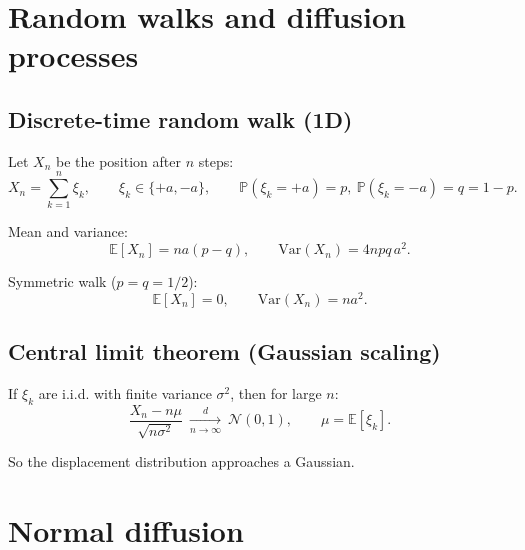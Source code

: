 
\section{Random walks and diffusion processes}

\subsection{Discrete-time random walk (1D)}
Let $X_n$ be the position after $n$ steps:
\begin{equation}
X_n = \sum_{k=1}^n \xi_k,
\qquad 
\xi_k \in \{+a,-a\},
\qquad 
\mathbb{P}(\xi_k=+a)=p,\ \mathbb{P}(\xi_k=-a)=q=1-p.
\end{equation}

Mean and variance:
\begin{equation}
\mathbb{E}[X_n] = n a (p-q),
\qquad
\mathrm{Var}(X_n)=4npq\,a^2.
\end{equation}

Symmetric walk ($p=q=1/2$):
\begin{equation}
\mathbb{E}[X_n]=0,
\qquad
\mathrm{Var}(X_n)=na^2.
\end{equation}

\subsection{Central limit theorem (Gaussian scaling)}
If $\xi_k$ are i.i.d. with finite variance $\sigma^2$, then for large $n$:
\begin{equation}
\frac{X_n - n\mu}{\sqrt{n\sigma^2}}
\ \xrightarrow[n\to\infty]{d}\
\mathcal{N}(0,1),
\qquad
\mu=\mathbb{E}[\xi_k].
\end{equation}

So the displacement distribution approaches a Gaussian.


\section{Normal diffusion}

